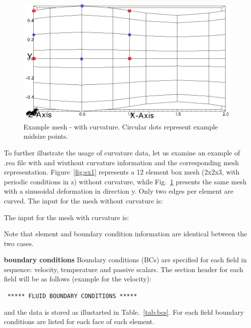 \begin{description}
\begin{figure}
\begin{center}
\includegraphics[scale=0.5]{Figs/modified1.png}
\caption{Example mesh -  with curvature. Circular dots represent example midsize points. }
\label{fig:ex2}
\end{center}
\end{figure}


To further illustrate the usage of curvature data, let us examine an example of .rea file with and wiuthout curvature information and the corresponding mesh representation. Figure~\ref{fig:ex1} represents a 12 element box mesh (2x2x3, with periodic conditions in z) without curvature, while Fig.~\ref{fig:ex2} presents the same mesh with a sinusoidal deformation in direction y. Only two edges per element are curved. 
The input for the mesh without curvature is:



The input for the mesh with curvature is: 



Note that element and boundary condition information are identical between the two cases.

\item{\bf boundary conditions} 
     Boundary conditions (BCs) are specified for each field in sequence: velocity, temperature and passive scalars. The section header for each field will be as follows (example for the velocity):
     \begin{center}
     \texttt{ ***** FLUID   BOUNDARY CONDITIONS *****}

     \end{center}
     and the data is stored as illustarted in Table.~\ref{tab:bcs}. For each field boundary conditions are listed for each face of each element. 


\end{description}
